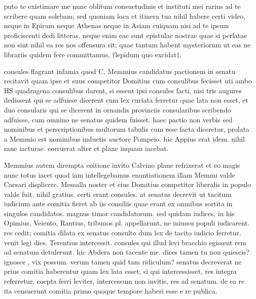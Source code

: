


 puto te existimare me nunc oblitum consuetudinis et instituti mei rarius ad te scribere quam solebam; sed quoniam loca et itinera tua nihil habere certi video, neque in Epirum neque Athenas neque in Asiam cuiquam nisi ad te ipsum proficiscenti dedi litteras. neque enim eae sunt epistulae nostrae quae si perlatae non sint nihil ea res nos offensura sit; quae tantum habent mysteriorum ut eas ne librariis quidem fere committamus, †lepidum quo excidat†.

 consules flagrant infamia quod C. Memmius candidatus pactionem in senatu recitavit quam ipse et suus competitor Domitius cum consulibus fecisset uti ambo HS quadragena consulibus darent, si essent ipsi consules facti, nisi tris augures dedissent qui se adfuisse dicerent cum lex curiata ferretur quae lata non esset, et duo consularis qui se dicerent in ornandis provinciis consularibus scribendo adfuisse, cum omnino ne senatus quidem fuisset. haec pactio non verbis sed nominibus et perscriptionibus multorum tabulis cum esse facta diceretur, prolata a Memmio est nominibus inductis auctore Pompeio. hic Appius erat idem. nihil sane iacturae. corruerat alter et plane inquam iacebat.

 Memmius autem dirempta coitione invito Calvino plane refrixerat et eo magis nunc totus iacet quod iam intellegebamus enuntiationem illam Memmi valde Caesari displicere. Messalla noster et eius Domitius competitor liberalis in populo valde fuit. nihil gratius. certi erant consules. at senatus decrevit ut tacitum iudicium ante comitia fieret ab iis consiliis quae erant ex omnibus sortita in singulos candidatos. magnus timor candidatorum. sed quidam iudices, in his Opimius, Veiento, Rantius, tribunos pl. appellarunt, ne iniussu populi iudicarent. res cedit; comitia dilata ex senatus consulto dum lex de tacito iudicio ferretur. venit legi dies. Terentius intercessit. consules qui illud levi bracchio egissent rem ad senatum detulerunt. hic Abdera non tacente me. dices tamen tu non quiescis? ignosce , vix possum. verum tamen quid tam ridiculum? senatus decreverat ne prius comitia haberentur quam lex lata esset; si qui intercessisset, res integra referretur. coepta ferri leviter, intercessum non invitis, res ad senatum. de ea re ita censuerunt comitia primo quoque tempore haberi esse e re publica.

